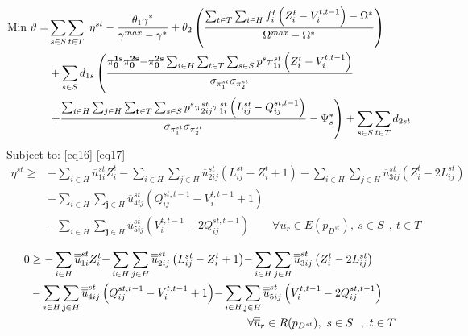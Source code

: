 \documentclass[review]{elsarticle}
\begin{document}
\begin{align}\label{eq44}
{\rm Min}\ \vartheta=&\sum_{s\in S}{\sum_{t\in T}{{\rm \ }\eta^{st}}}-\frac{{{\theta }_1\gamma }^*}{{\gamma }^{max}-{\gamma }^*}+{\theta }_2\left(\frac{\sum_{t\in T}{\sum_{i\in H}{f^t_i\left(Z^t_i-V^{t,t-1}_i\right)}}-{\Omega }^*}{{\Omega }^{max}-{\Omega }^*}\right)\\
&+\sum_{s\in S}{d_{1s}}\left(\frac{{\mathbf{ \pi }}^{\mathbf{ 1}\mathbf{ s}}_{\mathbf{ 0}}{\mathbf{ \pi }}^{\mathbf{ 2}\mathbf{ s}}_{\mathbf{ 0}}\mathbf{ -}{\mathbf{ \pi }}^{\mathbf{ 2}\mathbf{ s}}_{\mathbf{ 0}}\sum_{i\in H}{\sum_{t\in T}{\sum_{s\in S}{p^s{\pi }^{st}_{1i}\left(Z^t_i-V^{t,t-1}_i\right)}}}}{{\sigma }_{{\pi }^{st}_{1}}{\sigma }_{{\pi }^{st}_{2}}}\right.\nonumber\\
&\left.+\frac{\sum_{i\in H}{\sum_{j\in H}{\sum_{\mathbf{ t}\in T}{\sum_{s\in S}{p^s{\pi }^{st}_{2ij}{\pi }^{st}_{1i}\left(L^{st}_{ij}-Q^{st,t-1}_{ij}\right)}}}}}{{\sigma }_{{\pi }^{st}_{1}}{\sigma }_{{\pi }^{st}_{2}}}-{\Psi }^*_s\right)+\sum_{s\in S}{\sum_{t\in T}{d_{2st}}}\nonumber
\end{align}
Subject to: \eqref{eq16}-\eqref{eq17}
\begin{align}\label{eq45}
\eta^{st}\geq &-\sum_{i\in H}{{\overline{u}}^{st}_{1i}Z^t_i}-\sum_{i\in H}{\sum_{j\in H}{{\overline{u}}^{st}_{2ij}\left(L^{st}_{ij}-Z^t_i+1\right)}}-\sum_{i\in H}{\sum_{j\in H}{{\overline{u}}^{st}_{3ij}\left(Z^t_i-2L^{st}_{ij}\right)}}\\
&-\sum_{i\in H}{\sum_{\mathbf{ j}\in H}{{\overline{u}}^{st}_{4ij}\left(Q^{st,t-1}_{ij}-V^{t,t-1}_i+1\right)}}\nonumber\\
&-\sum_{i\in H}{\sum_{\mathbf{ j}\in H}{{\overline{u}}^{st}_{5ij}\left(V^{t,t-1}_i-2Q^{st,t-1}_{ij}\right)}}\qquad \forall {\overline{u}}_r\in E\left(p_{D^{st}}\right),\ s\in S\ \ ,\ t\in T\nonumber
\end{align}

\begin{align}\label{eq46}
0&\geq -\sum_{i\in H}{{\overline{\overline{u}}}^{st}_{1i}Z^t_i}\mathbf{ -}\sum_{i\in H}{\sum_{j\in H}{{\overline{\overline{u}}}^{st}_{2ij}\left(L^{st}_{ij}-Z^t_i+1\right)}}\mathbf{ -}\sum_{i\in H}{\sum_{j\in H}{{\overline{\overline{u}}}^{st}_{3ij}\left(Z^t_i-2L^{st}_{ij}\right)}}\\
&-\sum_{i\in H}{\sum_{\mathbf{ j}\in H}{{\overline{\overline{u}}}^{st}_{4ij}\left(Q^{st,t-1}_{ij}-V^{t,t-1}_i+1\right)}}\mathbf{ -}\sum_{i\in H}{\sum_{\mathbf{ j}\in H}{{\overline{\overline{u}}}^{st}_{5ij}\left(V^{t,t-1}_i-2Q^{st,t-1}_{ij}\right)}}\nonumber\\
&\hspace*{6.8cm}\forall {\overline{\overline{u}}}_r\in R(p_{D^{st}}),\ s\in S\ \ ,\ t\in T\nonumber
\end{align}
\end{document}
